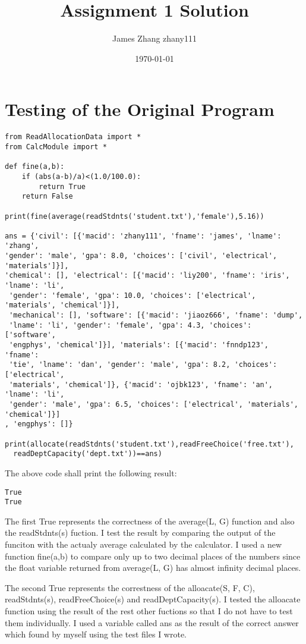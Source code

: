 \documentclass[12pt]{article}
\title{Assignment 1 Solution}
\author{James Zhang  zhany111}
\date{\today}
\begin{document}
\maketitle


\section{Testing of the Original Program}

\begin{lstlisting}
from ReadAllocationData import *
from CalcModule import *

def fine(a,b):
    if (abs(a-b)/a)<(1.0/100.0):
        return True
    return False

print(fine(average(readStdnts('student.txt'),'female'),5.16))

ans = {'civil': [{'macid': 'zhany111', 'fname': 'james', 'lname': 'zhang', 
'gender': 'male', 'gpa': 8.0, 'choices': ['civil', 'electrical', 'materials']}], 
'chemical': [], 'electrical': [{'macid': 'liy200', 'fname': 'iris', 'lname': 'li',
 'gender': 'female', 'gpa': 10.0, 'choices': ['electrical', 'materials', 'chemical']}],
 'mechanical': [], 'software': [{'macid': 'jiaoz666', 'fname': 'dump',
 'lname': 'li', 'gender': 'female', 'gpa': 4.3, 'choices': ['software',
 'engphys', 'chemical']}], 'materials': [{'macid': 'fnndp123', 'fname':
 'tie', 'lname': 'dan', 'gender': 'male', 'gpa': 8.2, 'choices': ['electrical',
 'materials', 'chemical']}, {'macid': 'ojbk123', 'fname': 'an', 'lname': 'li',
 'gender': 'male', 'gpa': 6.5, 'choices': ['electrical', 'materials', 'chemical']}]
, 'engphys': []}

print(allocate(readStdnts('student.txt'),readFreeChoice('free.txt'),
  readDeptCapacity('dept.txt'))==ans)
\end{lstlisting}

The above code shall print the following result:
\begin{lstlisting}
True
True

\end{lstlisting}

The first True represents the correctness of the average(L,  G) function and also the readStdnts(s) fuction. I test the result by comparing the output of the funciton with the 
actualy average calculated by the calculator. I used a new function fine(a,b) to compare only up to two decimal places of the numbers since the float variable returned from
average(L, G) has almost infinity decimal places. 

The second True represents the correstness of the alloacate(S, F, C), readStdnts(s), readFreeChoice(s) and readDeptCapacity(s). I tested the alloacate function using the result of the 
rest other fuctions so that I do not have to test them individually. I used a variable called ans as the result of the correct answer which found by myself using the test files I wrote.
\end{document}
